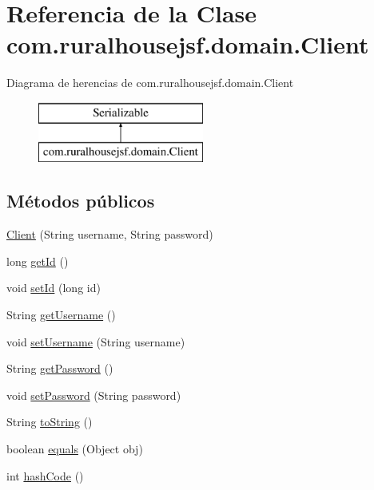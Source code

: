 \hypertarget{classcom_1_1ruralhousejsf_1_1domain_1_1_client}{}\section{Referencia de la Clase com.\+ruralhousejsf.\+domain.\+Client}
\label{classcom_1_1ruralhousejsf_1_1domain_1_1_client}
Diagrama de herencias de com.\+ruralhousejsf.\+domain.\+Client\begin{figure}[H]
\begin{center}
\leavevmode
\includegraphics[height=2.000000cm]{classcom_1_1ruralhousejsf_1_1domain_1_1_client}
\end{center}
\end{figure}
\subsection*{Métodos públicos}
\begin{DoxyCompactItemize}
\item 
\mbox{\hyperlink{classcom_1_1ruralhousejsf_1_1domain_1_1_client_a57bf8892cfbb684bcda11d6bb786871b}{Client}} (String username, String password)
\item 
long \mbox{\hyperlink{classcom_1_1ruralhousejsf_1_1domain_1_1_client_a522bbbbe3b397983a76056b4350126df}{get\+Id}} ()
\item 
void \mbox{\hyperlink{classcom_1_1ruralhousejsf_1_1domain_1_1_client_a0e4914e375b61e50427b5fbd15c0948f}{set\+Id}} (long id)
\item 
String \mbox{\hyperlink{classcom_1_1ruralhousejsf_1_1domain_1_1_client_a0ae33acded961afcf93152d917bf1aa1}{get\+Username}} ()
\item 
void \mbox{\hyperlink{classcom_1_1ruralhousejsf_1_1domain_1_1_client_acf233b95ed06204b7724cc7d277352ab}{set\+Username}} (String username)
\item 
String \mbox{\hyperlink{classcom_1_1ruralhousejsf_1_1domain_1_1_client_a5ecd4e7fd82dec1d7348730379be6b54}{get\+Password}} ()
\item 
void \mbox{\hyperlink{classcom_1_1ruralhousejsf_1_1domain_1_1_client_a89d703e0377510769b326334f31fbb8d}{set\+Password}} (String password)
\item 
String \mbox{\hyperlink{classcom_1_1ruralhousejsf_1_1domain_1_1_client_a9af93d16608b629f3606f859b0ec85e9}{to\+String}} ()
\item 
boolean \mbox{\hyperlink{classcom_1_1ruralhousejsf_1_1domain_1_1_client_acf199d84c39f08cea14078ef175be9f5}{equals}} (Object obj)
\item 
int \mbox{\hyperlink{classcom_1_1ruralhousejsf_1_1domain_1_1_client_aaa86bcfe5247f3aeae9daec9600cf70c}{hash\+Code}} ()
\end{DoxyCompactItemize}


